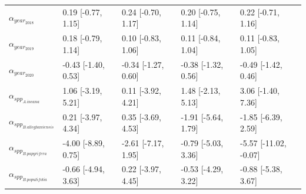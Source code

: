 \begin{table}[ht]
\begin{tabular}{lllll}
  $\alpha_{year_{2018}}$ & 0.19 [-0.77, 1.15] & 0.24 [-0.70, 1.17] & 0.20 [-0.75, 1.14] & 0.22 [-0.71, 1.16] \\ 
  $\alpha_{year_{2019}}$ & 0.18 [-0.79, 1.14] & 0.10 [-0.83, 1.06] & 0.11 [-0.84, 1.04] & 0.11 [-0.83, 1.05] \\ 
  $\alpha_{year_{2020}}$ & -0.43 [-1.40, 0.53] & -0.34 [-1.27, 0.60] & -0.38 [-1.32, 0.56] & -0.49 [-1.42, 0.46] \\ 
  $\alpha_{spp_{A. incana}}$ & 1.06 [-3.19, 5.21] & 0.11 [-3.92, 4.21] & 1.48 [-2.13, 5.13] & 3.06 [-1.40, 7.36] \\ 
  $\alpha_{spp_{B. alleghaniensis}}$ & 0.21 [-3.97, 4.34] & 0.35 [-3.69, 4.53] & -1.91 [-5.64, 1.79] & -1.85 [-6.39, 2.59] \\ 
  $\alpha_{spp_{B. papyrifera}}$ & -4.00 [-8.89, 0.75] & -2.61 [-7.17, 1.95] & -0.79 [-5.03, 3.36] & -5.57 [-11.02, -0.07] \\ 
  $\alpha_{spp_{B. populifolia}}$ & -0.66 [-4.94, 3.63] & 0.22 [-3.97, 4.45] & -0.53 [-4.29, 3.22] & -0.88 [-5.38, 3.67] \\ 
   \hline
\end{tabular}
\end{table}


